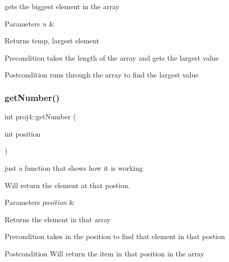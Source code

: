 gets the biggest element in the array 
\begin{DoxyParams}{Parameters}
{\em n} & \\
\hline
\end{DoxyParams}
\begin{DoxyReturn}{Returns}
temp, largest element 
\end{DoxyReturn}
\begin{DoxyPrecond}{Precondition}
takes the length of the array and gets the largest value 
\end{DoxyPrecond}
\begin{DoxyPostcond}{Postcondition}
runs through the array to find the largest value 
\end{DoxyPostcond}
\mbox{\label{classproj4_a03877ba5b77cc470509002a5df7e94fe}} 
\subsubsection{\texorpdfstring{get\+Number()}{getNumber()}}
{\footnotesize\ttfamily int proj4\+::get\+Number (\begin{DoxyParamCaption}\item[{int}]{position }\end{DoxyParamCaption})}



just a function that shows how it is working 

Will return the element at that postion.


\begin{DoxyParams}{Parameters}
{\em position} & \\
\hline
\end{DoxyParams}
\begin{DoxyReturn}{Returns}
the element in that array 
\end{DoxyReturn}
\begin{DoxyPrecond}{Precondition}
takes in the position to find that element in that postion 
\end{DoxyPrecond}
\begin{DoxyPostcond}{Postcondition}
Will return the item in that position in the array 
\end{DoxyPostcond}
\mbox{\label{classproj4_ac923b04f0a279f04b89220b4f33973de}} 
